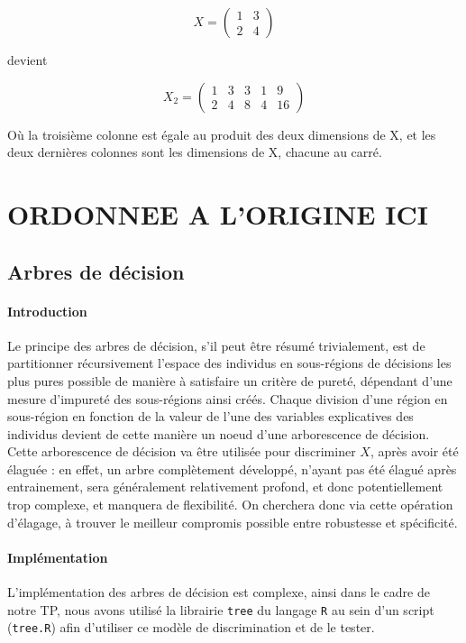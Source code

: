 \documentclass{report}
\begin{document}
$$ X = \begin{pmatrix} 1 & 3 \\ 2 & 4 \end{pmatrix}$$


devient


$$ X_2 = \begin{pmatrix} 1 & 3 & 3 & 1 & 9 \\
2 & 4 & 8 & 4 & 16 \end{pmatrix}$$

Où la troisième colonne est égale au produit des deux dimensions de X, et les deux dernières colonnes sont les dimensions de X, chacune au carré.

\newpage

\section{ORDONNEE A L'ORIGINE ICI}

\subsection{Arbres de décision}
\paragraph{Introduction}
Le principe des arbres de décision, s'il peut être résumé trivialement, est de partitionner récursivement l'espace des individus en sous-régions de décisions les plus pures possible de manière à satisfaire un critère de pureté, dépendant d'une mesure d'impureté des sous-régions ainsi créés. Chaque division d'une région en sous-région en fonction de la valeur de l'une des variables explicatives des individus devient de cette manière un noeud d'une arborescence de décision. Cette arborescence de décision va être utilisée pour discriminer $X$, après avoir été élaguée : en effet, un arbre complètement développé, n'ayant pas été élagué après entrainement, sera généralement relativement profond, et donc potentiellement trop complexe, et manquera de flexibilité. On cherchera donc via cette opération d'élagage, à trouver le meilleur compromis possible entre robustesse et spécificité.

\paragraph{Implémentation}
L'implémentation des arbres de décision est complexe, ainsi dans le cadre de notre TP, nous avons utilisé la librairie \verb+tree+ du langage \verb+R+ au sein d'un script (\verb+tree.R+) afin d'utiliser ce modèle de discrimination et de le tester.
\end{document}
